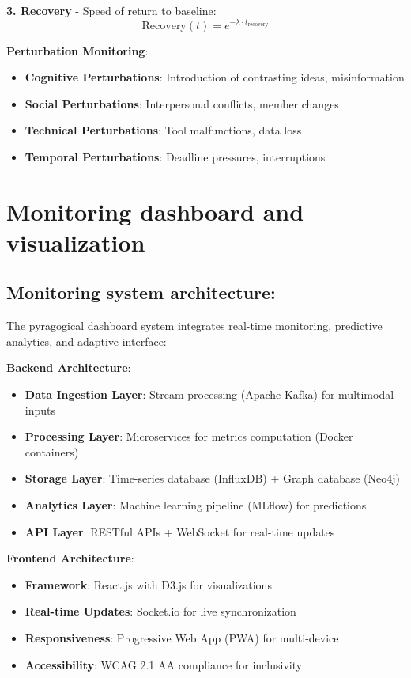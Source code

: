 \textbf{3. Recovery} - Speed of return to baseline:
\begin{equation}
	\text{Recovery}(t) = e^{-\lambda \cdot t_{\text{recovery}}}
	\label{eq:recovery}
\end{equation}

\textbf{Perturbation Monitoring}:

\begin{itemize}
	\item \textbf{Cognitive Perturbations}: Introduction of contrasting ideas, misinformation
	\item \textbf{Social Perturbations}: Interpersonal conflicts, member changes
	\item \textbf{Technical Perturbations}: Tool malfunctions, data loss
	\item \textbf{Temporal Perturbations}: Deadline pressures, interruptions
\end{itemize}

\section{Monitoring dashboard and visualization}
\subsection*{Monitoring system architecture:}

The pyragogical dashboard system integrates real-time monitoring, predictive analytics, and adaptive interface:

\textbf{Backend Architecture}:
\begin{itemize}
	\item \textbf{Data Ingestion Layer}: Stream processing (Apache Kafka) for multimodal inputs
	\item \textbf{Processing Layer}: Microservices for metrics computation (Docker containers)  
	\item \textbf{Storage Layer}: Time-series database (InfluxDB) + Graph database (Neo4j)
	\item \textbf{Analytics Layer}: Machine learning pipeline (MLflow) for predictions
	\item \textbf{API Layer}: RESTful APIs + WebSocket for real-time updates
\end{itemize}

\textbf{Frontend Architecture}:
\begin{itemize}
	\item \textbf{Framework}: React.js with D3.js for visualizations
	\item \textbf{Real-time Updates}: Socket.io for live synchronization
	\item \textbf{Responsiveness}: Progressive Web App (PWA) for multi-device
	\item \textbf{Accessibility}: WCAG 2.1 AA compliance for inclusivity
\end{itemize}

